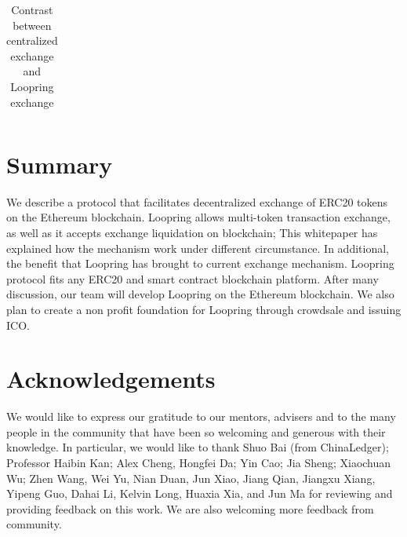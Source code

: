 \documentclass[UTF8,nofonts]{article}
\begin{document}
\begin{table}[hbt]
\begin{tabular}{p{5cm}|p{2.5cm}|p{2.5cm}}
  \end{tabular}

\caption{Contrast between centralized exchange and Loopring exchange} %
\end{table}



\section{Summary\label{sec: summary}}

We describe a protocol that facilitates decentralized exchange of ERC20 tokens on the Ethereum blockchain. Loopring allows multi-token transaction exchange,  as well as it accepts exchange liquidation on blockchain; This whitepaper has explained how the mechanism work under different circumstance. In additional,  the benefit that Loopring has brought to current exchange mechanism.
Loopring protocol fits any ERC20 and smart contract blockchain platform. After many discussion,  our team will develop Loopring on the Ethereum blockchain.
We also plan to create a non profit foundation for Loopring through crowdsale and issuing ICO.

\section{Acknowledgements\label{sec: acknowledgement}}

We would like to express our gratitude to our mentors,  advisers and to the many people in the community that have been so welcoming and generous with their knowledge. In particular,  we would like to thank Shuo Bai (from ChinaLedger); Professor Haibin Kan; Alex Cheng, Hongfei Da; Yin Cao; Jia Sheng; Xiaochuan Wu; Zhen Wang, Wei Yu, Nian Duan, Jun Xiao, Jiang Qian, Jiangxu Xiang, Yipeng Guo, Dahai Li, Kelvin Long, Huaxia Xia, and Jun Ma for reviewing and providing feedback on this work. We are also welcoming more feedback from community.

\newpage  


\end{document}
